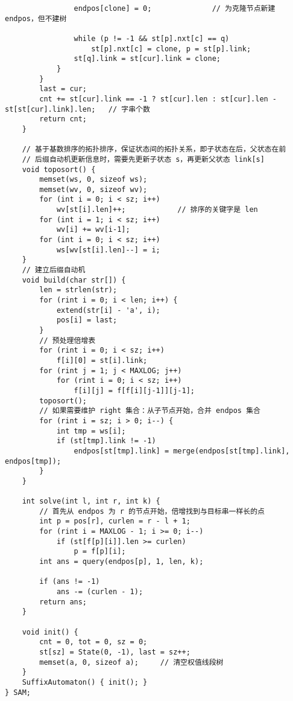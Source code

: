 \begin{verbatim}
                endpos[clone] = 0;              // 为克隆节点新建 endpos，但不建树

                while (p != -1 && st[p].nxt[c] == q)
                    st[p].nxt[c] = clone, p = st[p].link;
                st[q].link = st[cur].link = clone;
            }
        }
        last = cur;   
        cnt += st[cur].link == -1 ? st[cur].len : st[cur].len - st[st[cur].link].len;   // 字串个数
        return cnt;          
    }
    
    // 基于基数排序的拓扑排序，保证状态间的拓扑关系，即子状态在后，父状态在前
    // 后缀自动机更新信息时，需要先更新子状态 s，再更新父状态 link[s]
    void toposort() {
        memset(ws, 0, sizeof ws);
        memset(wv, 0, sizeof wv);
        for (int i = 0; i < sz; i++)
            wv[st[i].len]++;            // 排序的关键字是 len
        for (int i = 1; i < sz; i++)
            wv[i] += wv[i-1];
        for (int i = 0; i < sz; i++)
            ws[wv[st[i].len]--] = i;
    }
    // 建立后缀自动机
    void build(char str[]) {
        len = strlen(str);
        for (rint i = 0; i < len; i++) {
            extend(str[i] - 'a', i);
            pos[i] = last;
        }
        // 预处理倍增表
        for (rint i = 0; i < sz; i++)
            f[i][0] = st[i].link;
        for (rint j = 1; j < MAXLOG; j++)
            for (rint i = 0; i < sz; i++)
                f[i][j] = f[f[i][j-1]][j-1];
        toposort();
        // 如果需要维护 right 集合：从子节点开始，合并 endpos 集合
        for (rint i = sz; i > 0; i--) {
            int tmp = ws[i];
            if (st[tmp].link != -1)
                endpos[st[tmp].link] = merge(endpos[st[tmp].link], endpos[tmp]);
        }
    }
    
    int solve(int l, int r, int k) {
        // 首先从 endpos 为 r 的节点开始，倍增找到与目标串一样长的点
        int p = pos[r], curlen = r - l + 1;
        for (rint i = MAXLOG - 1; i >= 0; i--)
            if (st[f[p][i]].len >= curlen)
                p = f[p][i];
        int ans = query(endpos[p], 1, len, k);
        
        if (ans != -1)
            ans -= (curlen - 1);
        return ans;
    }

    void init() {
        cnt = 0, tot = 0, sz = 0;
        st[sz] = State(0, -1), last = sz++;
        memset(a, 0, sizeof a);     // 清空权值线段树
    }
    SuffixAutomaton() { init(); }
} SAM;
\end{verbatim}

\clearpage